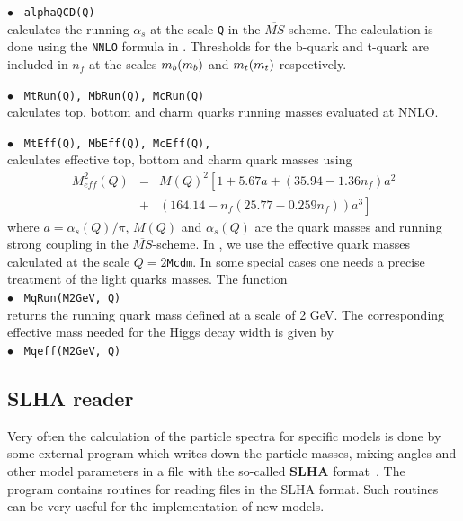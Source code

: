 \documentclass[12pt,a4paper]{article}
\begin{document}
\noindent$\bullet$ \verb| alphaQCD(Q)|\\
calculates the  running $\alpha_s$ at the scale \verb|Q| in the
$\overline{MS}$ scheme. The calculation is done using the
\verb|NNLO| formula in \cite{Eidelman:2004wy}. Thresholds for the 
b-quark and t-quark  are included in  $n_f$ at the scales $m_b(m_b)$
and $m_t(m_t)$ respectively.

\noindent$\bullet$ \verb| MtRun(Q), MbRun(Q), McRun(Q) | \\
calculates top, bottom and charm quarks running masses evaluated
at NNLO.

\noindent$\bullet$ \verb| MtEff(Q), MbEff(Q), McEff(Q),  | \\
calculates effective top, bottom and charm quark masses using
~\cite{Eidelman:2004wy}
\begin{eqnarray}
\label{meff}
 M_{eff}^2(Q)&=&M(Q)^2\left[1+5.67a + (35.94-1.36n_f)a^2 \right.\nonumber\\
 &+& \left.(164.14-n_f(25.77-0.259n_f))a^3\right]
\end{eqnarray}
where $a=\alpha_s(Q)/\pi$,    $M(Q)$  and $\alpha_s(Q)$    are the
quark masses and running strong coupling  in the
$\overline{MS}$-scheme. In \micro, we use the effective
quark masses calculated at the scale $Q=2${\tt Mcdm}.
In some special cases one needs a precise treatment of the light quarks masses. The function\\
\noindent$\bullet$ \verb| MqRun(M2GeV, Q)| \\
returns the  running quark mass defined at a scale of 2 GeV. The corresponding
effective mass needed for the Higgs decay width is given by \\
\noindent$\bullet$ \verb| Mqeff(M2GeV, Q)|


\subsection{SLHA reader}
\label{SLHA} 
Very often the calculation of the particle spectra for specific 
models is done by some external program which writes down 
the particle masses, mixing angles and other 
model parameters in a file with the so-called  {\bf SLHA} format~\cite{Skands:2003cj,Allanach:2008qq}. 
The \micro~ program contains routines for  reading files in the SLHA format. 
Such routines can be very useful for the implementation of new models.
\end{document}
